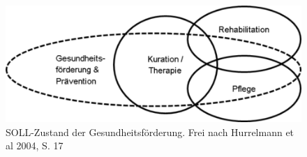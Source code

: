\begin{figure}
	\centering
		\includegraphics{ist-soll.png}
	\caption{SOLL-Zustand der Gesundheitsförderung. Frei nach Hurrelmann et al 2004, S. 17}
	\label{fig:ist-soll}
\end{figure}



